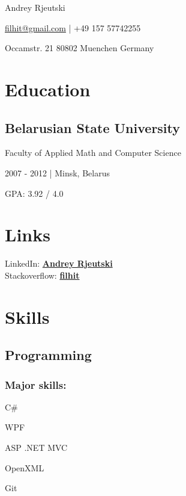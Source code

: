 \documentclass{article}
\begin{document}
  Andrey Rjeutski

  \href{mailto:filhit@gmail.com}{filhit@gmail.com} | +49 157 57742255
  
  Occamstr. 21 80802 Muenchen Germany

  \begin{minipage}[t]{0.39\textwidth}

    \section*{Education} 
    \subsection*{Belarusian State University}
    Faculty of Applied Math and Computer Science
	
    2007 - 2012 | Minsk, Belarus
	
	GPA: 3.92 / 4.0

    \section*{Links} 
    LinkedIn: \href{https://linkedin.com/in/andrey-rjeutski-92064741}{\bf Andrey Rjeutski} \\
    Stackoverflow: \href{http://stackoverflow.com/users/3506292/filhit}{\bf filhit}

    \section*{Skills}
    \subsection*{Programming}
    \subsubsection*{Major skills:}
	\begin{inparaitem}
      \item C\# 
	  \item WPF
	  \item ASP .NET MVC
	  \item OpenXML
	  \item Git
	\end{inparaitem}
	

\end{minipage}
\end{document}
